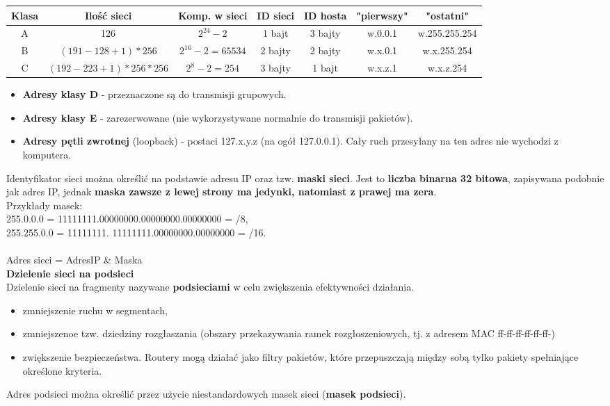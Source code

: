 \documentclass[a4paper]{article}
\begin{document}
\begin{tabular}{|c|c|c|c|c|c|c|}
\hline
Klasa & Ilość sieci & Komp. w sieci & ID sieci & ID hosta & "pierwszy" & "ostatni"\\
\hline
A & 126 & $2^{24}-2$ & 1 bajt & 3 bajty & w.0.0.1 & w.255.255.254\\
\hline
B & $(191-128+1)*256$ & $2^{16}-2 = 65 534$ & 2 bajty & 2 bajty & w.x.0.1 & w.x.255.254\\
\hline
C & $(192-223+1)*256*256$ & $2^8 -2 = 254$ & 3 bajty & 1 bajt & w.x.z.1 & w.x.z.254\\
\hline
\end{tabular}

\begin{itemize}
\item \textbf{Adresy klasy D} - przeznaczone są do transmisji grupowych.
\item \textbf{Adresy klasy E} - zarezerwowane (nie wykorzystywane normalnie do transmisji pakietów).
\item \textbf{Adresy pętli zwrotnej} (loopback) - postaci 127.x.y.z (na ogół 127.0.0.1). Cały ruch przesyłany na ten adres nie wychodzi z komputera.
\end{itemize}

Identyfikator sieci można określić na podstawie adresu IP oraz tzw. \textbf{maski sieci}. Jest to \textbf{liczba binarna 32 bitowa}, zapisywana podobnie jak adres IP, jednak \textbf{maska zawsze z lewej strony ma jedynki, natomiast z prawej ma zera}.\\
Przykłady masek:\\
255.0.0.0 = 11111111.00000000.00000000.00000000 = /8,\\
255.255.0.0 = 11111111. 11111111.00000000.00000000 = /16.\\
\\
Adres sieci = AdresIP \& Maska\\


\textbf{Dzielenie sieci na podsieci}\\
Dzielenie sieci na fragmenty nazywane \textbf{podsieciami} w celu zwiększenia efektywności działania.
\begin{itemize}
    \item zmniejszenie ruchu w segmentach,
    \item zmniejszenoe tzw. dziedziny rozgłaszania (obszary przekazywania ramek rozgłoszeniowych,
    tj. z adresem MAC ff-ff-ff-ff-ff-ff-)
    \item zwiększenie bezpieczeństwa. Routery mogą działać jako filtry pakietów, które
    przepuszczają między sobą tylko pakiety spełniające określone kryteria.
\end{itemize}
Adres podsieci można określić przez użycie niestandardowych masek sieci (\textbf{masek podsieci}).
\end{document}
